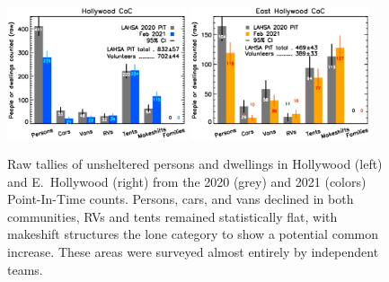 \documentclass[11pt]{article}
\begin{document}
\begin{figure}[h]
	\centering
	\includegraphics[width = 0.47\textwidth, trim = 1cm 0cm 0cm 0cm]{Hwood2021Bars}
	\includegraphics[width = 0.47\textwidth, trim = 1cm 0cm 0cm 0cm]{Eho2021Bars}
	\caption{Raw tallies of unsheltered persons and dwellings in Hollywood (left) and E.~Hollywood
			(right) from the 2020 (grey) and 2021 (colors) Point-In-Time counts. Persons, cars, 
			and vans declined in both communities, RVs and tents remained statistically flat, with 
			makeshift structures the lone category to show a potential common increase. 
			These areas were surveyed almost entirely by independent teams.}
	\label{fig:rawCounts}
\end{figure}
\end{document}
